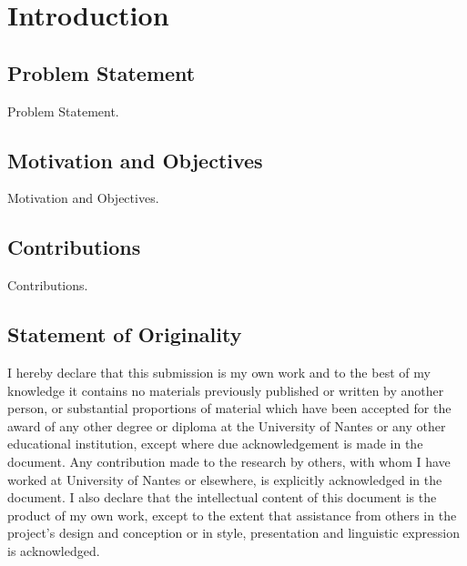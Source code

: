 
\chapter{Introduction}

\section{Problem Statement}

Problem Statement.

\section{Motivation and Objectives}

Motivation and Objectives.

\section{Contributions}

Contributions.

\section{Statement of Originality}

I hereby declare that this submission is my own work and to the best of my knowledge it contains no materials previously published or written by another person, or substantial proportions of material which have been accepted for the award of any other degree or diploma at the University of Nantes or any other educational institution, except where due acknowledgement is made in the document. Any contribution made to the research by others, with whom I have worked at University of Nantes or elsewhere, is explicitly acknowledged in the document. I also declare that the intellectual content of this document is the product of my own work, except to the extent that assistance from others in the project's design and conception or in style, presentation and linguistic expression is acknowledged.

